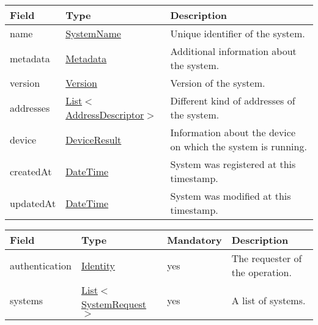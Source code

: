 \documentclass[a4paper]{arrowhead}
\newcommand{\pref}[1]{{\textcolor{ArrowheadGrey}{\hyperref[sec:model:primitives:#1]{#1}}}}
\begin{document}
 
\begin{table}[ht!]
\begin{tabularx}{\textwidth}{| p{2.5cm} | p{4cm} | X |} \hline
\rowcolor{gray!33} Field & Type      & Description \\ \hline
name & \pref{SystemName} & Unique identifier of the system. \\ \hline
metadata & \hyperref[sec:model:Metadata]{Metadata} & Additional information about the system. \\ \hline
version & \pref{Version} & Version of the system. \\ \hline
addresses &  \pref{List}$<$\hyperref[sec:model:AddressDescriptor]{AddressDescriptor}$>$ & Different kind of addresses of the system.  \\ \hline
device & \hyperref[sec:model:DeviceResult]{DeviceResult} & Information about the device on which the system is running. \\ \hline
createdAt & \pref{DateTime} & System was registered at this timestamp. \\ \hline
updatedAt & \pref{DateTime} & System was modified at this timestamp. \\ \hline
\end{tabularx}
\end{table}

\clearpage

 
\begin{table}[ht!]
\begin{tabularx}{\textwidth}{| p{2.5cm} | p{3.5cm} | p{2cm} | X |} \hline
\rowcolor{gray!33} Field & Type & Mandatory & Description \\ \hline
authentication & \hyperref[sec:model:Identity]{Identity} & yes & The requester of the operation. \\ \hline
systems & \pref{List}$<$\hyperref[sec:model:SystemRequest]{SystemRequest}$>$ & yes & A list of systems. \\ \hline
\end{tabularx}
\end{table}

 
\end{document}
